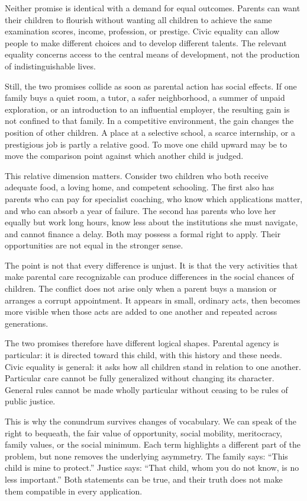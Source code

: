 ﻿\documentclass[12pt,a4paper]{book}
\begin{document}
Neither promise is identical with a demand for equal outcomes.  Parents can
want their children to flourish without wanting all children to achieve the
same examination scores, income, profession, or prestige.  Civic equality
can allow people to make different choices and to develop different talents.
The relevant equality concerns access to the central means of development,
not the production of indistinguishable lives.

Still, the two promises collide as soon as parental action has social
effects.  If one family buys a quiet room, a tutor, a safer neighborhood, a
summer of unpaid exploration, or an introduction to an influential employer,
the resulting gain is not confined to that family.  In a competitive
environment, the gain changes the position of other children.  A place at a
selective school, a scarce internship, or a prestigious job is partly a
relative good.  To move one child upward may be to move the comparison point
against which another child is judged.

This relative dimension matters.  Consider two children who both receive
adequate food, a loving home, and competent schooling.  The first also has
parents who can pay for specialist coaching, who know which applications
matter, and who can absorb a year of failure.  The second has parents who
love her equally but work long hours, know less about the institutions she
must navigate, and cannot finance a delay.  Both may possess a formal right
to apply.  Their opportunities are not equal in the stronger sense.

The point is not that every difference is unjust.  It is that the very
activities that make parental care recognizable can produce differences in
the social chances of children.  The conflict does not arise only when a
parent buys a mansion or arranges a corrupt appointment.  It appears in
small, ordinary acts, then becomes more visible when those acts are added to
one another and repeated across generations.

The two promises therefore have different logical shapes.  Parental agency
is particular: it is directed toward this child, with this history and these
needs.  Civic equality is general: it asks how all children stand in
relation to one another.  Particular care cannot be fully generalized
without changing its character.  General rules cannot be made wholly
particular without ceasing to be rules of public justice.

This is why the conundrum survives changes of vocabulary.  We can speak of
the right to bequeath, the fair value of opportunity, social mobility,
meritocracy, family values, or the social minimum.  Each term highlights a
different part of the problem, but none removes the underlying asymmetry.
The family says: ``This child is mine to protect.'' Justice says: ``That
child, whom you do not know, is no less important.'' Both statements can be
true, and their truth does not make them compatible in every application.
\end{document}
